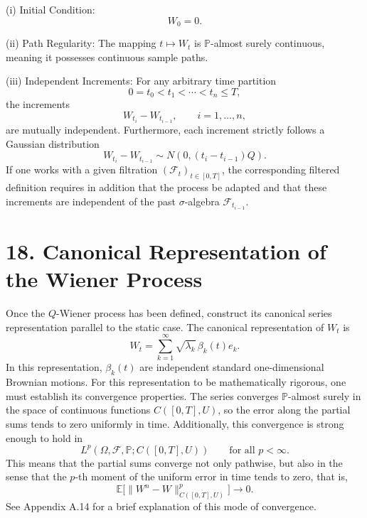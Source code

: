 \documentclass[11pt]{article}
\theoremstyle{definition}
\theoremstyle{remark}
\begin{document}
\noindent (i) Initial Condition:
\[
W_0=0.
\]

\noindent (ii) Path Regularity: The mapping \(t\mapsto W_t\) is \(\mathbb P\)-almost surely continuous, meaning it possesses continuous sample paths.

\noindent (iii) Independent Increments: For any arbitrary time partition
\[
0=t_0<t_1<\cdots<t_n\le T,
\]
the increments
\[
W_{t_i}-W_{t_{i-1}},
\qquad i=1,\ldots,n,
\]
are mutually independent. Furthermore, each increment strictly follows a Gaussian distribution
\[
W_{t_i}-W_{t_{i-1}}\sim N(0,(t_i-t_{i-1})Q).
\]
If one works with a given filtration \((\mathcal F_t)_{t\in[0,T]}\), the corresponding filtered definition requires in addition that the process be adapted and that these increments are independent of the past \(\sigma\)-algebra \(\mathcal F_{t_{i-1}}\).

\section*{18. Canonical Representation of the Wiener Process}
Once the \(Q\)-Wiener process has been defined, construct its canonical series representation parallel to the static case. The canonical representation of \(W_t\) is
\[
W_t=\sum_{k=1}^\infty \sqrt{\lambda_k}\,\beta_k(t)e_k.
\]
In this representation, \(\beta_k(t)\) are independent standard one-dimensional Brownian motions. For this representation to be mathematically rigorous, one must establish its convergence properties. The series converges \(\mathbb P\)-almost surely in the space of continuous functions \(C([0,T],U)\), so the error along the partial sums tends to zero uniformly in time. Additionally, this convergence is strong enough to hold in
\[
L^p(\Omega,\mathcal F,\mathbb P;C([0,T],U))
\qquad \text{for all } p<\infty.
\]
This means that the partial sums converge not only pathwise, but also in the sense that the \(p\)-th moment of the uniform error in time tends to zero, that is,
\[
\mathbb E\bigl[\|W^n-W\|_{C([0,T],U)}^p\bigr]\to 0.
\]
See Appendix A.14 for a brief explanation of this mode of convergence.
\end{document}
